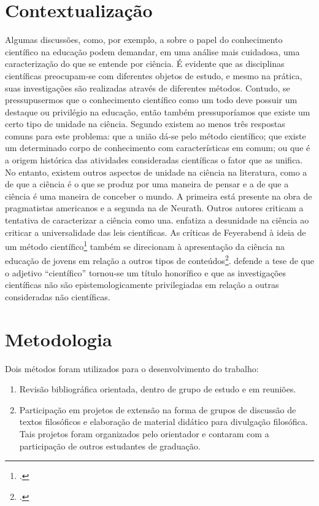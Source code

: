 \documentclass[12pt]{report}
\begin{document}
		\section*{Contextualização}		
		Algumas discussões, como, por exemplo, a sobre o papel do conhecimento científico na educação podem demandar, em uma análise mais cuidadosa, uma caracterização do que se entende por ciência.
		É evidente que as disciplinas científicas preocupam-se com diferentes objetos de estudo, e mesmo na prática, suas investigações são realizadas através de diferentes métodos.
		Contudo, se pressupusermos que o conhecimento científico como um todo deve possuir um destaque ou privilégio na educação, então também pressuporíamos que existe um certo tipo de unidade na ciência.
		Segundo \textcite{cunha-unidade} existem ao menos três respostas comuns para este problema: que a união dá-se pelo método científico; que existe um determinado corpo de conhecimento com características em comum; ou que é a origem histórica das atividades consideradas científicas o fator que as unifica.
		No entanto, existem outros aspectos de unidade na ciência na literatura, como a de que a ciência é o que se produz por uma maneira de pensar e a de que a ciência é uma maneira de conceber o mundo. A primeira está presente na obra de pragmatistas americanos e a segunda na de Neurath.
		Outros autores criticam a tentativa de caracterizar a ciência como una.
		\textcite{cartwright-dappled-world} enfatiza a desunidade na ciência ao criticar a universalidade das leis científicas.
		As críticas de Feyerabend à ideia de um método científico\footcite{feyerabend-against-method} também se direcionam à apresentação da ciência na educação de jovens em relação a outros tipos de conteúdos\footcite{feyerabend-science-free-society}.
		\textcite{haack-defending-science} defende a tese de que o adjetivo “científico” tornou-se um título honorífico e que as investigações científicas não são epistemologicamente privilegiadas em relação a outras consideradas não científicas. 
	
		\section*{Metodologia}
		
		Dois métodos foram utilizados para o desenvolvimento do trabalho:
		
		\begin{enumerate}
			\item Revisão bibliográfica orientada, dentro de grupo de estudo e em reuniões.
			\item Participação em projetos de extensão na forma de grupos de discussão de textos filosóficos e elaboração de material didático para divulgação filosófica. Tais projetos foram organizados pelo orientador e contaram com a participação de outros
			estudantes de graduação. 
		\end{enumerate}
\end{document}
